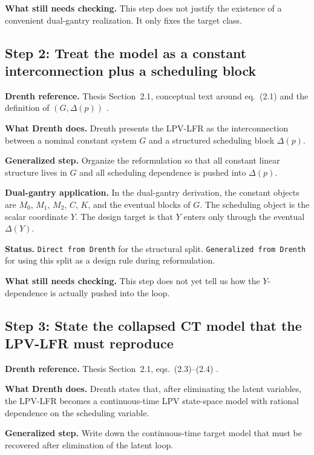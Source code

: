 \documentclass[11pt]{article}
\newcommand{\audititem}[2]{\par\smallskip\noindent\textbf{#1.} #2\par}
\newcommand{\statusline}[1]{\texttt{#1}}
\begin{document}
\audititem{What still needs checking}{This step does not justify the existence
of a convenient dual-gantry realization. It only fixes the target class.}

\subsection{Step 2: Treat the model as a constant interconnection plus a scheduling block}

\audititem{Drenth reference}{Thesis Section~2.1, conceptual text around
eq.~(2.1) and the definition of $(G,\Delta(p))$ \cite{drenth2025thesis}.}

\audititem{What Drenth does}{Drenth presents the LPV-LFR as the interconnection
between a nominal constant system $G$ and a structured scheduling block
$\Delta(p)$.}

\audititem{Generalized step}{Organize the reformulation so that all constant
linear structure lives in $G$ and all scheduling dependence is pushed into
$\Delta(p)$.}

\audititem{Dual-gantry application}{In the dual-gantry derivation, the constant
objects are $M_0$, $M_1$, $M_2$, $C$, $K$, and the eventual blocks of $G$.
The scheduling object is the scalar coordinate $Y$. The design target is that
$Y$ enters only through the eventual $\Delta(Y)$.}

\audititem{Status}{\statusline{Direct from Drenth} for the structural split.
\statusline{Generalized from Drenth} for using this split as a design rule
during reformulation.}

\audititem{What still needs checking}{This step does not yet tell us how the
$Y$-dependence is actually pushed into the loop.}

\subsection{Step 3: State the collapsed CT model that the LPV-LFR must reproduce}

\audititem{Drenth reference}{Thesis Section~2.1, eqs.~(2.3)--(2.4)
\cite{drenth2025thesis}.}

\audititem{What Drenth does}{Drenth states that, after eliminating the latent
variables, the LPV-LFR becomes a continuous-time LPV state-space model with
rational dependence on the scheduling variable.}

\audititem{Generalized step}{Write down the continuous-time target model that
must be recovered after elimination of the latent loop.}
\end{document}
